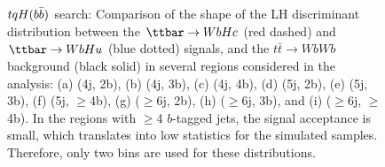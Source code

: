 \begin{figure}[htbp]
\begin{center}
 \\
 \\
\caption{$tqH(b\bar{b})$ search: Comparison of the shape of the LH discriminant distribution between the $\Hc$ (red dashed) and $\Hu$ (blue dotted) signals, 
and the $t\bar{t}\to WbWb$ background (black solid) in several regions considered in the analysis:
(a) (4j, 2b), (b) (4j, 3b), (c) (4j, 4b), (d) (5j, 2b), (e) (5j, 3b), (f) (5j, $\geq$4b), (g) ($\geq$6j, 2b), 
(h) ($\geq$6j, 3b), and (i) ($\geq$6j, $\geq$4b). 
In the regions with $\geq$4 $b$-tagged jets, the signal acceptance is small, which translates
into low statistics for the simulated samples. Therefore, only two bins are used for these distributions.} 
\label{fig:LHD}
\end{center}
\end{figure}



